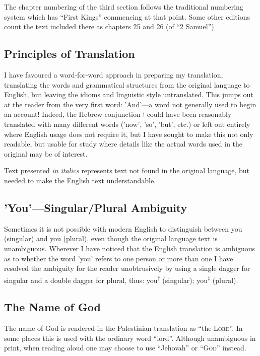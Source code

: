 {The chapter numbering of the third section follows the traditional
numbering system which has ``First Kings'' commencing at that
point. Some other editions count the text included there as chapters
25 and 26 (of ``2 Samuel'') 


\subsection*{Principles of Translation}

I have favoured a word-for-word approach in preparing my translation,
translating the words and grammatical structures from the original
language to English, but leaving the idioms and linguistic style
untranslated. This jumps out at the reader from the very first word:
'And'---a word not generally used to begin an account! Indeed, the
Hebrew conjunction \texthebrew{ו} could have been reasonably translated with many
different words ('now', 'so', 'but', etc.) or left out entirely where
English usage does not require it, but I have sought to make this not
only readable, but usable for study where details like the actual words
used in the original may be of interest.

Text presented \textit{in italics} represents text not found in the original
language, but needed to make the English text understandable.

\subsection*{'You'---Singular/Plural Ambiguity}

Sometimes it is not possible with modern English to distinguish between
you (singular) and you (plural), even though the original language text
is unambiguous. Wherever I have noticed that the English translation is
ambiguous as to whether the word 'you' refers to one person or more than
one I have resolved the ambiguity for the reader unobtrusively by using
a single dagger for singular and a double dagger for plural, thus:
you\textsuperscript{†} (singular); you\textsuperscript{‡} (plural).

\subsection*{The Name of God}

The name of God is rendered in the Palestinian translation as ``the \textsc{Lord}''. In some places this is
used with the ordinary word ``lord''. Although unambiguous in print,
when reading aloud one may choose to use ``Jehovah'' or
``\textsc{God}'' instead.

}
